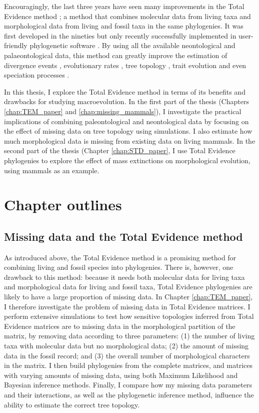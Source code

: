 Encouragingly, the last three years have seen many improvements in the Total Evidence method \citep{ronquista2012,slaterphylogenetic2013,Wood01032013,schragocombining2013,beckancient2014,Arcila2015131,Dembo2015}; a method that combines molecular data from living taxa and morphological data from living and fossil taxa in the same phylogenies.
It was first developed in the nineties \citep{eernissetaxonomic1993} but only recently successfully implemented in user-friendly phylogenetic software \citep{Ronquist2012mrbayes,BEAST2}.
By using all the available neontological and palaeontological data, this method can greatly improve the estimation of divergence events \citep[e.g.][]{ronquista2012}, evolutionary rates \citep[e.g.][]{beckancient2014}, tree topology \citep[e.g.][]{Dembo2015}, trait evolution \citep[e.g.][]{slaterphylogenetic2013} and even speciation processes \citep[e.g.][]{Wood01032013}.

In this thesis, I explore the Total Evidence method in terms of its benefits and drawbacks for studying macroevolution.
In the first part of the thesis (Chapters \ref{chap:TEM_paper} and \ref{chap:missing_mammals}), I investigate the practical implications of combining paleontological and neontological data by focusing on the effect of missing data on tree topology using simulations. I also estimate how much morphological data is missing from existing data on living mammals.
In the second part of the thesis (Chapter \ref{chap:STD_paper}, I use Total Evidence phylogenies to explore the effect of mass extinctions on morphological evolution, using mammals as an example.

\section{Chapter outlines}
\subsection{Missing data and the Total Evidence method}
As introduced above, the Total Evidence method is a promising method for combining living and fossil species into phylogenies.
There is, however, one drawback to this method: because it needs both molecular data for living taxa and morphological data for living and fossil taxa, Total Evidence phylogenies are likely to have a large proportion of missing data.
In Chapter \ref{chap:TEM_paper}, I therefore investigate the problem of missing data in Total Evidence matrices.
I perform extensive simulations to test how sensitive topologies inferred from Total Evidence matrices are to missing data in the morphological partition of the matrix, by removing data according to three parameters: (1) the number of living taxa with molecular data but no morphological data; (2) the amount of missing data in the fossil record; and (3) the overall number of morphological characters in the matrix.
I then build phylogenies from the complete matrices, and matrices with varying amounts of missing data, using both Maximum Likelihood and Bayesian inference methods.
Finally, I compare how my missing data parameters and their interactions, as well as the phylogenetic inference method, influence the ability to estimate the correct tree topology.


